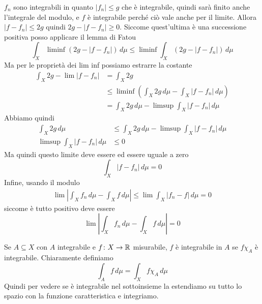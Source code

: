 \documentclass[a4paper]{article}
\begin{document}
\begin{snippetproof}{}
    \(f_n\) sono integrabili in quanto \(|f_n| \leq g\) che è integrabile, quindi sarà finito anche
    l'integrale del modulo, e \(f\) è integrabile perché ciò vale anche per il limite.
    Allora \(|f-f_n| \leq 2g\) quindi \(2g - |f-f_n| \geq 0\). Siccome quest'ultima è una successione positiva
    posso applicare il lemma di Fatou
    \[
        \int_X \liminf (2g - |f-f_n|)\,d\mu \leq \liminf
        \int_X (2g - |f-f_n|)\,d\mu
    \]
    Ma per le proprietà dei lim inf possiamo estrarre la costante
    \begin{align*}
        \int_X 2g - \lim|f-f_n| &= \int_X 2g \\
        &\leq \liminf \left( \int_X 2g\,d\mu - \int_X |f-f_n|\,d\mu \right) \\
        &= \int_X 2g \,d\mu - \limsup \int_X |f-f_n|\,d\mu
    \end{align*}
    Abbiamo quindi
    \begin{align*}
        \int_X 2g\,d\mu &\leq \int_X 2g\,d\mu - \limsup \int_X |f-f_n|\,d\mu \\
        \limsup \int_X |f-f_n|\,d\mu &\leq 0
    \end{align*}
    Ma quindi questo limite deve essere ed essere uguale a zero
    \[
        \int_X |f-f_n|\,d\mu = 0
    \]
    Infine, usando il modulo
    \begin{align*}
        \lim \left|
            \int_X f_n \,d\mu - \int_X f \,d\mu
        \right| \leq \lim \int_X |f_n-f|\,d\mu = 0
    \end{align*}
    siccome è tutto positivo deve essere 
    \[
        \lim \left|
            \int_X f_n \,d\mu - \int_X f \,d\mu
        \right| = 0
    \]
\end{snippetproof}

Se \(A \subseteq X\) con \(A\) integrabile e \(f\colon X \to \mathbb{R}\)
misurabile, \(f\) è integrabile in \(A\) se \(f\chi_A\) è integrabile.
Chiaramente definiamo
\[
    \int_A f\,d\mu = \int_X f\chi_A\,d\mu
\]
Quindi per vedere se è integrabile nel sottoinsieme la estendiamo su tutto lo spazio con
la funzione caratteristica e integriamo.
\end{document}
